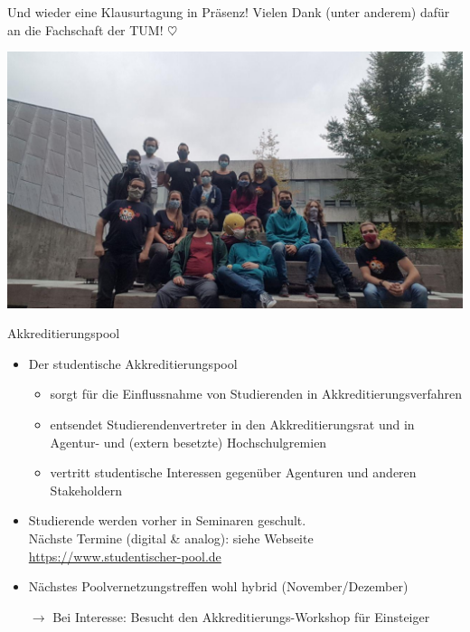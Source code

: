\documentclass[compress, aspectratio=169]{beamer}
\begin{document}
\begin{frame}
\centering
Und wieder eine Klausurtagung in Präsenz! Vielen Dank (unter anderem) dafür an die Fachschaft der TUM! $\heartsuit$
\vspace{.5cm}

\includegraphics[width=.6\textwidth]{klausurtagung.jpg}
\end{frame}


\begin{frame}{Akkreditierungspool}
    \begin{itemize}
        \item Der studentische Akkreditierungspool
        \begin{itemize}
        	\item sorgt für die Einflussnahme von Studierenden in Akkreditierungsverfahren
        	\item entsendet Studierendenvertreter in den Akkreditierungsrat und in Agentur- und (extern besetzte) Hochschulgremien
        	\item vertritt studentische Interessen gegenüber Agenturen und anderen Stakeholdern
        \end{itemize}         
        \item Studierende werden vorher in Seminaren geschult. \\
          {\scriptsize\color{blue} Nächste Termine (digital \& analog): siehe Webseite \url{https://www.studentischer-pool.de}}
        \item Nächstes Poolvernetzungstreffen wohl hybrid {\color{blue} (November/Dezember)}
        \vspace{0.5cm}
        \item[$\rightarrow$] Bei Interesse: Besucht den Akkreditierungs-Workshop für Einsteiger
    \end{itemize}
\end{frame}
\end{document}
